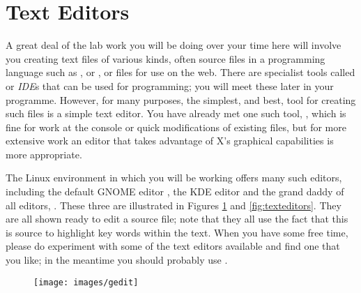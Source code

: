 \section{Text Editors}





A great deal of the lab work you will be doing over your time here
will involve you creating text files of various kinds, often source
files in a programming language such as ,  or
, or  files for use on the web. There are
specialist tools called
 or \emph{IDE}s that can be used for programming; you
will meet these later in your programme. However, for many purposes,
the simplest, and best, tool for creating such files is a simple text
editor. You have already met one such tool, , which is
fine for work at the console or quick modifications of existing files,
but for more extensive work an editor that takes advantage of X's
graphical capabilities is more appropriate.

The Linux environment in which you will be working offers many such
editors, including the default GNOME editor , the KDE
editor  and the grand daddy of all editors,
. These three are illustrated in Figures \ref{fig:gedit}
and \ref{fig:texteditors}. They are all shown ready to edit a
 source file; note that they all use the fact that this is
 source to highlight key words within the text. When you
have some free time, please do experiment with some of the text
editors available and find one that you like; in the meantime you
should probably use .

\begin{figure}
  \centering
\texttt{[image: images/gedit]}  
  \caption{}
  \label{fig:gedit}
\end{figure}

